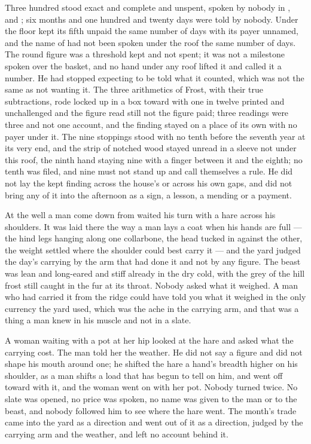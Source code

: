Three hundred stood exact and complete and unspent, spoken by nobody in ,  and ; six months and one hundred and twenty days were told by nobody. Under the floor  kept its fifth unpaid the same number of days with its payer unnamed, and the name of  had not been spoken under the roof the same number of days. The round figure was a threshold kept and not spent; it was not a milestone spoken over the basket, and no hand under any roof lifted it and called it a number. He had stopped expecting to be told what it counted, which was not the same as not wanting it. The three arithmetics of Frost, with their true subtractions, rode locked up  in a box toward  with one in twelve printed and unchallenged and the figure read still not the figure paid; three readings were three and not one account, and the finding stayed on a place of its own with no payer under it. The nine stoppings stood with no tenth before the seventh year at its very end, and the strip of notched wood stayed unread in a sleeve not under this roof, the ninth hand staying nine with a finger between it and the eighth; no tenth was filed, and nine must not stand up and call themselves a rule. He did not lay the kept finding across the house's  or across his own gaps, and did not bring any of it into the afternoon as a sign, a lesson, a mending or a payment.

\scenebreak

At the well a man come down from  waited his turn with a hare across his shoulders. It was laid there the way a man lays a coat when his hands are full --- the hind legs hanging along one collarbone, the head tucked in against the other, the weight settled where the shoulder could best carry it --- and the yard judged the day's carrying by the arm that had done it and not by any figure. The beast was lean and long-eared and stiff already in the dry cold, with the grey of the hill frost still caught in the fur at its throat. Nobody asked what it weighed. A man who had carried it from the ridge could have told you what it weighed in the only currency the yard used, which was the ache in the carrying arm, and that was a thing a man knew in his muscle and not in a slate.

A woman waiting with a pot at her hip looked at the hare and asked what the carrying cost. The man told her the weather. He did not say a figure and did not shape his mouth around one; he shifted the hare a hand's breadth higher on his shoulder, as a man shifts a load that has begun to tell on him, and went off toward  with it, and the woman went on with her pot. Nobody turned twice. No slate was opened, no price was spoken, no name was given to the man or to the beast, and nobody followed him to see where the hare went. The month's trade came into the yard as a direction and went out of it as a direction, judged by the carrying arm and the weather, and left no account behind it.

